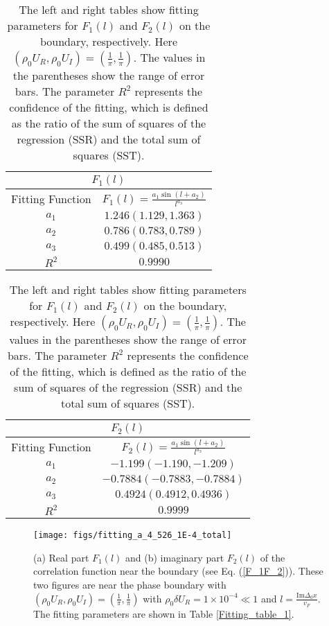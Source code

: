 \documentclass[aps,onecolumn,superscriptaddress,notitlepage,longbibliography]{revtex4-1}
\begin{document}
\begin{table}
	\begin{tabular}{|c|c|}
		\hline 
		\multicolumn{2}{|c|}{$F_{1}(l)$}\tabularnewline
		\hline
		\hline 
		Fitting Function & $F_1(l)=\frac{a_{1}\sin(l+a_{2})}{l^{a_{3}}}$\tabularnewline
		\hline 
		$a_{1}$ & $1.246(1.129,1.363)$\tabularnewline
		\hline 
		$a_{2}$ & $0.786(0.783,0.789)$\tabularnewline
		\hline 
		$a_{3}$ & $0.499(0.485,0.513)$\tabularnewline
		\hline 
		$R^{2}$ & $0.9990$\tabularnewline
		\hline 
	\end{tabular}%
	\begin{tabular}{|c|c|}
		\hline 
		\multicolumn{2}{|c|}{$F_{2}(l)$}\tabularnewline
		\hline 
		\hline
		Fitting Function & $F_{2}(l)=\frac{a_{1}\sin(l+a_{2})}{l^{a_{3}}}$\tabularnewline
		\hline 
		$a_{1}$ & $-1.199(-1.190,-1.209)$\tabularnewline
		\hline 
		$a_{2}$ & $-0.7884(-0.7883,-0.7884)$\tabularnewline
		\hline 
		$a_{3}$ & $0.4924(0.4912,0.4936)$\tabularnewline
		\hline 
		$R^{2}$ & $0.9999$\tabularnewline
		\hline 
	\end{tabular}
	
	\caption{The left and right tables show fitting parameters for $F_1(l)$ and $F_2(l)$ on the boundary, respectively. Here $(\rho_{0}U_{R},\rho_{0}U_{I})=(\frac{1}{\pi},\frac{1}{\pi})$. The values in the parentheses show the range of error bars. The parameter $R^2$ represents the confidence of the fitting, which is defined as the ratio of the sum of squares of the regression (SSR) and the total sum of squares (SST).}
	
	\label{fitting_table_2}
\end{table}
\begin{figure}[t]
	\centering \texttt{[image: figs/fitting\_a\_4\_526\_1E-4\_total]}
	\caption{(a) Real part $F_1(l)$ and (b) imaginary part $F_2(l)$ of the correlation function near the boundary (see Eq. (\ref{F_1F_2})). These two figures are near the phase boundary with $(\rho_{0}U_{R},\rho_{0}U_{I})=(\frac{1}{\pi},\frac{1}{\pi})$ with $\rho_{0}\delta U_{R}=1\times10^{-4}\ll1$ and $l=\frac{\text{Im}\Delta_0x}{v_F}.$ The fitting parameters are shown in Table \ref{Fitting_table_1}.}
	\label{fig1}
\end{figure}
\end{document}
